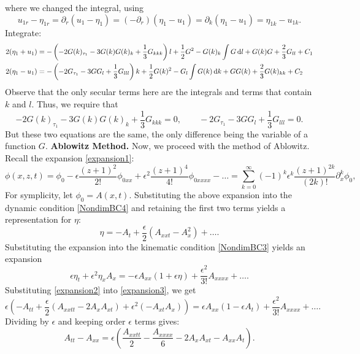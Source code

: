 \documentclass[10pt,reqno,oneside,a4paper]{article}
\begin{document}
where we changed the integral, using
\[ 
u_{1r} - \eta_{1r} = \partial_r (u_1 - \eta_1) = (-\partial_r)(\eta_1 - u_1) = \partial_k(\eta_1 - u_1) = \eta_{1k} - u_{1k}.
\]
Integrate:
\begin{align*}
2(\eta_{1} + u_{1}) &= -\left(-2G(k)_{\tau_1} - 3 G(k)G(k)_k + \frac{1}{3}G_{kkk}\right)l + \frac{1}{2}G^2  - G(k)_k \int G \,\mathrm{d} l + G(k)G + \frac{2}{3} G_{ll} + C_1 \\
2(\eta_{1} - u_{1}) &=  - \left(-2G_{\tau_1} - 3GG_l + \frac{1}{3}G_{lll}\right)k + \frac{1}{2}G(k)^2 - G_l \int G(k) \,\mathrm{d} k +GG(k) + \frac{2}{3}G(k)_{kk} + C_2 
\end{align*}
Observe that the only secular terms here are the integrals and terms that contain $k$ and $l.$ Thus, we require that 
\[ 
-2G(k)_{\tau_1} - 3 G(k)G(k)_k + \frac{1}{3}G_{kkk} = 0, \qquad -2G_{\tau_1} - 3GG_l + \frac{1}{3}G_{lll} = 0.
\] 
But these two equations are the same, the only difference being the variable of a function $G.$ 
\vspace{1cm}
\newline \textbf{Ablowitz Method.} Now, we proceed with the method of Ablowitz. Recall the expansion \eqref{expansion1}:
\[
\phi(x,z,t) = \phi_0 - \epsilon\frac{(z+1)^2}{2!}\phi_{0xx} + \epsilon^2 \frac{(z+1)^4}{4!}\phi_{0xxxx} - \ldots = \sum^{\infty}_{k=0} (-1)^k \epsilon^k \frac{(z+1)^{2k}}{(2k)!} \partial^k_x \phi_0,
\]
For symplicity, let $\phi_0 = A(x,t).$ Substituting the above expansion into the dynamic condition \eqref{NondimBC4} and retaining the first two terms yields a representation for $\eta:$
\begin{equation}\label{expansion2}
\eta = -A_t + \frac{\epsilon}{2}(A_{xxt} - A_x^2) + \ldots .
\end{equation}
Substituting the expansion into the kinematic condition \eqref{NondimBC3} yields an expansion
\begin{equation}\label{expansion3}
\epsilon \eta_t + \epsilon^2 \eta_x A_x = -\epsilon A_{xx}(1+ \epsilon \eta) + \frac{\epsilon^2}{3!}A_{xxxx} + \ldots .
\end{equation}
Substituting \eqref{expansion2} into \eqref{expansion3}, we get 
\begin{equation}\label{well-posed}
\epsilon(-A_{tt} + \frac{\epsilon}{2}(A_{xxtt} - 2A_xA_{xt})+\epsilon^2(-A_{xt}A_x)) = \epsilon A_{xx}(1- \epsilon A_t) + \frac{\epsilon^2}{3!}A_{xxxx} + \ldots.
\end{equation}
Dividing by $\epsilon$ and keeping order $\epsilon$ terms gives:
\[ 
A_{tt} - A_{xx} = \epsilon\left(\frac{A_{xxtt}}{2} - \frac{A_{xxxx}}{6} - 2A_xA_{xt} - A_{xx}A_{t}\right).
\]
\end{document}
